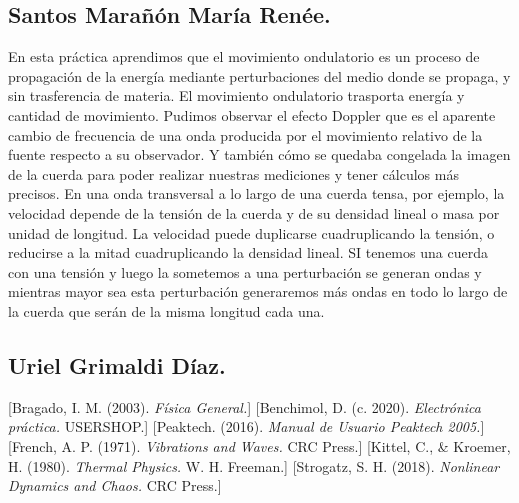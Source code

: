 \documentclass[10pt]{article}
\begin{document}
\begin{multicols}{2}
\subsection*{Santos Marañón María Renée.}
En esta práctica aprendimos que el movimiento ondulatorio es un proceso de propagación de la energía mediante perturbaciones del medio donde se propaga, y sin trasferencia de materia. El movimiento ondulatorio trasporta energía y cantidad de movimiento. Pudimos observar el efecto Doppler que es el aparente cambio de frecuencia de una onda producida por el movimiento relativo de la fuente respecto a su observador. Y también cómo se quedaba congelada la imagen de la cuerda para poder realizar nuestras mediciones y tener cálculos más precisos. En una onda transversal a lo largo de una cuerda tensa, por ejemplo, la velocidad depende de la tensión de la cuerda y de su densidad lineal o masa por unidad de longitud. La velocidad puede duplicarse cuadruplicando la tensión, o reducirse a la mitad cuadruplicando la densidad lineal. SI tenemos una cuerda con una tensión y luego la sometemos a una perturbación se generan ondas y mientras mayor sea esta perturbación generaremos más ondas en todo lo largo de la cuerda que serán de la misma longitud cada una.

\subsection*{Uriel Grimaldi Díaz.}
\begin{thebibliography}{0}
    [Bragado, I. M. (2003). \textit{Física General.}]
    [Benchimol, D. (c. 2020). \textit{Electrónica práctica.} USERSHOP.]
    [Peaktech. (2016). \textit{Manual de Usuario Peaktech 2005.}]
    [French, A. P. (1971). \textit{Vibrations and Waves.} CRC Press.]
    [Kittel, C., \& Kroemer, H. (1980). \textit{Thermal Physics.} W. H. Freeman.]
    [Strogatz, S. H. (2018). \textit{Nonlinear Dynamics and Chaos.} CRC Press.]
\end{thebibliography}

\end{multicols}
\end{document}

